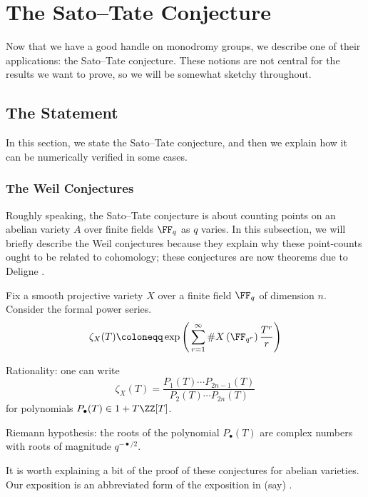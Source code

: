 \documentclass[../thesis.tex]{subfiles}
\begin{document}
\chapter{The Sato--Tate Conjecture}
Now that we have a good handle on monodromy groups, we describe one of their applications: the Sato--Tate conjecture. These notions are not central for the results we want to prove, so we will be somewhat sketchy throughout.

\section{The Statement} \label{sec:sato-tate}
In this section, we state the Sato--Tate conjecture, and then we explain how it can be numerically verified in some cases.

\subsection{The Weil Conjectures}
Roughly speaking, the Sato--Tate conjecture is about counting points on an abelian variety $A$ over finite fields $\FF_q$ as $q$ varies. In this subsection, we will briefly describe the Weil conjectures because they explain why these point-counts ought to be related to cohomology; these conjectures are now theorems due to Deligne \cite{deligne-weil-1,deligne-weil-2}.
\begin{theorem} \label{thm:weil-conj}
	Fix a smooth projective variety $X$ over a finite field $\FF_q$ of dimension $n$. Consider the formal power series.
	\[\zeta_X(T)\coloneqq\exp\Bigg(\sum_{r=1}^\infty\#X\left(\FF_{q^r}\right)\frac{T^r}r\Bigg)\]
	\begin{listalph}
		\item Rationality: one can write
		\[\zeta_X(T)=\frac{P_1(T)\cdots P_{2n-1}(T)}{P_2(T)\cdots P_{2n}(T)}\]
		for polynomials $P_\bullet(T)\in 1+T\ZZ[T]$.
		\item Riemann hypothesis: the roots of the polynomial $P_\bullet(T)$ are complex numbers with roots of magnitude $q^{-\bullet/2}$.
	\end{listalph}
\end{theorem}
It is worth explaining a bit of the proof of these conjectures for abelian varieties. Our exposition is an abbreviated form of the exposition in (say) \cite[Chapter~II]{milne-av}.
\end{document}
